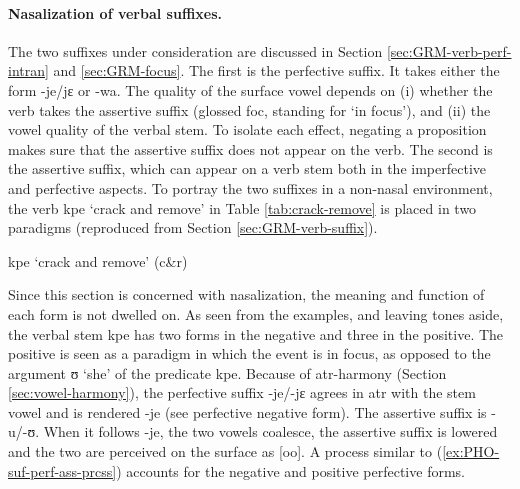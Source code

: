 \paragraph{Nasalization of verbal suffixes.}
\label{sec:nasalization-verb-suffix}

The two suffixes under consideration are discussed in Section
\ref{sec:GRM-verb-perf-intran}
and \ref{sec:GRM-focus}.  The first is  the perfective suffix.  It takes
either the form {\sls -je/jɛ} or {\sls -wa}.
The quality of the surface vowel depends on (i) whether the verb takes the
assertive suffix (glossed {\sc foc}, standing for `in focus'),  and (ii) the
vowel quality of the verbal stem. To isolate each effect, negating a proposition
makes sure that the assertive suffix does not appear on the verb. The second is
the assertive suffix, which can appear on a verb stem both in the imperfective
and perfective aspects.  To portray the two suffixes in a non-nasal environment,
 the verb {\sls kpe} `crack and remove' in Table \ref{tab:crack-remove}  is 
placed in two paradigms (reproduced from Section \ref{sec:GRM-verb-suffix}). 



\begin{table}[!htb]
\small
\centering
\caption{{\sls kpe} {\rm `crack
and remove'} (c\&r)  \label{tab:crack-remove}}

\quad
{}
\end{table}


Since this section is concerned with nasalization, the
meaning and
function of each form is not dwelled on. As
seen from the examples, and leaving tones aside, the
verbal stem {\sls kpe} has two forms in the negative and three in the positive.
The positive is seen as a paradigm in which the event is in focus, as opposed
to the argument {\sls ʊ} `she' of the predicate {\sls kpe}. Because of
{\sc atr}-harmony (Section \ref{sec:vowel-harmony}), the
perfective suffix {\sls -je/-jɛ} agrees in {\sc atr} with the stem vowel and is 
rendered {\sls -je} (see perfective negative form).
The assertive suffix is {\sls -u/-ʊ}. When it follows {\sls  
 -je}, the two vowels coalesce, the assertive suffix is lowered and the two are
perceived on the surface as [{\sls oo}]. A process similar to 
(\ref{ex:PHO-suf-perf-ass-prcss})  accounts for the negative and
positive 
perfective forms.


